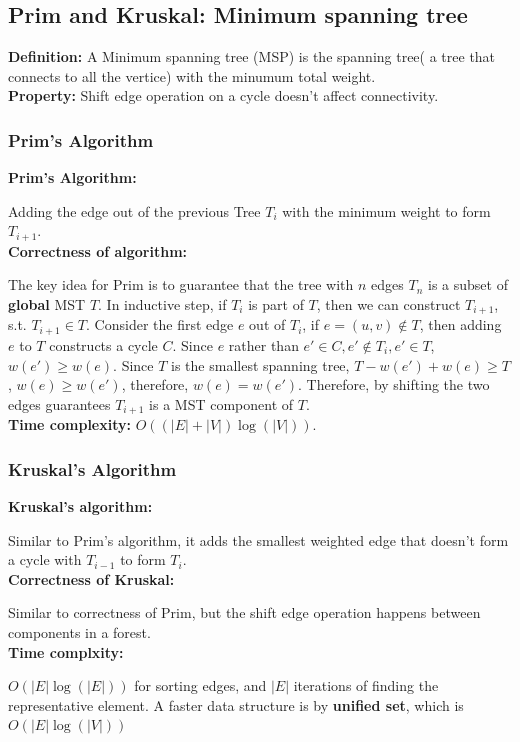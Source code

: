 \subsection{Prim and Kruskal: Minimum spanning tree}
\textbf{Definition:}
A Minimum spanning tree (MSP) is the spanning tree( a tree that connects to all the vertice) with the minumum total weight.\\
\textbf{Property:}
Shift edge operation on a cycle doesn't affect connectivity.

\subsubsection{Prim's Algorithm}
\textbf{Prim's Algorithm:} 

Adding the edge out of the previous Tree $T_i$ with the minimum weight to form $T_{i+1}$.\\
\textbf{Correctness of algorithm:}

The key idea for Prim is to guarantee that the tree with $n$ edges $T_n$ is a subset of \textbf{global} MST $T$. 
In inductive step, if $T_{i}$ is part of $T$, then we can construct $T_{i+1}$, s.t. $T_{i+1}\in T$.
Consider the first edge $e$ out of $T_{i}$, if $e=(u,v) \notin T$, then adding $e$ to $T$ constructs a cycle $C$. 
Since $e$ rather than $e' \in C, e' \notin T_{i}, e' \in T$, $w(e')\geq w(e)$. Since $T$ is the smallest spanning tree, $T-w(e')+w(e)\geq T$, $w(e)\geq w(e')$, therefore, $w(e)=w(e')$. Therefore, by shifting the two edges guarantees $T_{i+1}$ is a MST component of $T$.\\
\textbf{Time complexity:} $O((|E|+|V|)\log(|V|))$.\\



\subsubsection{Kruskal's Algorithm}
\textbf{Kruskal's algorithm:} 

Similar to Prim's algorithm, it adds the smallest weighted edge that doesn't form a cycle with $T_{i-1}$ to form $T_i$.\\
\textbf{Correctness of Kruskal:} 

Similar to correctness of Prim, but the shift edge operation happens between components in a forest.\\
\textbf{Time complxity:}

$O(|E|\log(|E|))$ for sorting edges, and $|E|$ iterations of finding the representative element. A faster data structure is by \textbf{unified set}, which is $O(|E|\log(|V|))$ \\

